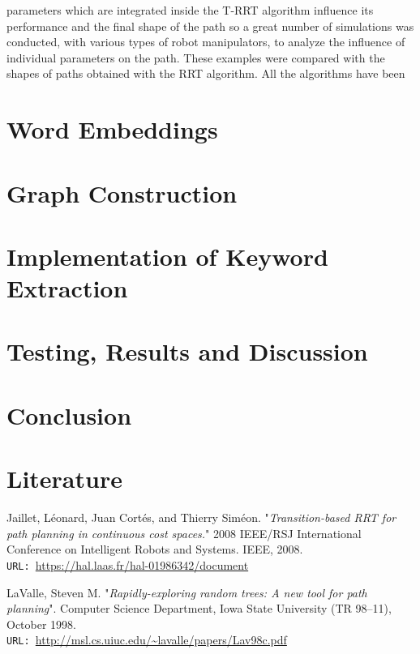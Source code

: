 \documentclass[12pt]{article}
\numberwithin{equation}{section}
\begin{document}
\begin{spacing}{1.5}
	 parameters which are integrated inside the T-RRT algorithm influence its performance and the final shape of the path so a great number of simulations was conducted, with various types of robot manipulators, to analyze the influence of individual parameters on the path. These examples were compared with the shapes of paths obtained with the RRT algorithm. All the algorithms have been \cite{RRT}
	 
	\section{Word Embeddings}
	
	\section{Graph Construction}
	
	\section{Implementation of Keyword Extraction}
	
	\section{Testing, Results and Discussion}
	
	\section{Conclusion}
	
	\newpage
	\section{Literature}
	
	\begin{thebibliography}{8}
		Jaillet, Léonard, Juan Cortés, and Thierry Siméon. "\textit{Transition-based RRT for path planning in continuous cost spaces.}" 2008 IEEE/RSJ International Conference on Intelligent Robots and Systems. IEEE, 2008. \\
		\texttt{URL: }\url{https://hal.laas.fr/hal-01986342/document}
		
		LaValle, Steven M. "\textit{Rapidly-exploring random trees: A new tool for path planning}". Computer Science Department, Iowa State University (TR 98–11), October 1998.\\
		\texttt{URL: }\url{http://msl.cs.uiuc.edu/~lavalle/papers/Lav98c.pdf}
		

\end{thebibliography}
\end{spacing}
\end{document}
